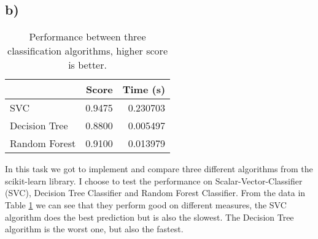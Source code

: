 \documentclass{article}
\begin{document}
      \subsection{b)}
        \begin{table}[h]
          \centering
          \label{tbl:task1b}
          \begin{tabular}{lrr}
            \toprule
            {} &   Score &  Time (s) \\
            \midrule
            SVC           &  0.9475 &  0.230703 \\
            Decision Tree &  0.8800 &  0.005497 \\
            Random Forest &  0.9100 &  0.013979 \\
            \bottomrule
          \end{tabular}
          \caption{Performance between three classification algorithms, higher score is better.}
        \end{table}
        In this task we got to implement and compare three different algorithms from the scikit-learn 
        library. I choose to test the performance on Scalar-Vector-Classifier (SVC), Decision Tree Classifier and
        Random Forest Classifier.
        From the data in Table \ref{tbl:task1b} we can see that they perform good on different measures, the SVC algorithm 
        does the best prediction but is also the slowest. The Decision Tree algorithm is the worst one, but also the fastest.
        
\end{document}
